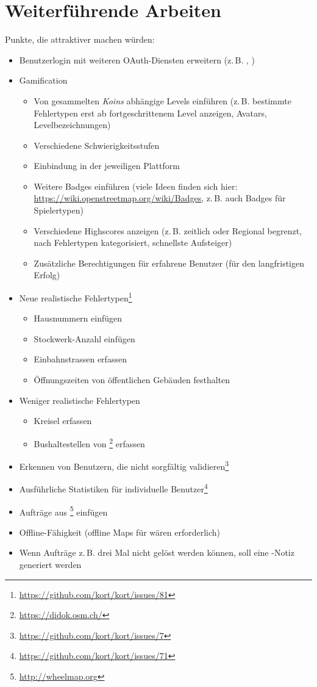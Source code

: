 \section{Weiterführende Arbeiten}
\label{pd-weiterentwicklung-realistisch}
Punkte, die \kort{} attraktiver machen würden:

\begin{itemize}
	\item Benutzerlogin mit weiteren \gls{OAuth}-Diensten erweitern (z.\,B. , )
	\item \gls{Gamification}
	\begin{itemize}
		\item Von gesammelten \emph{Koins} abhängige Levels einführen (z.\,B. bestimmte Fehlertypen erst ab fortgeschrittenem Level anzeigen, Avatars, Levelbezeichnungen)
		\item Verschiedene Schwierigkeitsstufen
		\item Einbindung in  der jeweiligen Plattform
		\item Weitere Badges einführen (viele Ideen finden sich hier: \url{https://wiki.openstreetmap.org/wiki/Badges}, z.\,B. auch Badges für Spielertypen)
		\item Verschiedene Highscores anzeigen (z.\,B. zeitlich oder Regional begrenzt, nach Fehlertypen kategorisiert, schnellste Aufsteiger)
		\item Zusätzliche Berechtigungen für erfahrene Benutzer (für den langfristigen Erfolg)
	\end{itemize}
	\item Neue realistische Fehlertypen\footnote{\url{https://github.com/kort/kort/issues/81}}
	\begin{itemize}
		\item Hausnummern einfügen
		\item Stockwerk-Anzahl einfügen
		\item Einbahnstrassen erfassen
		\item Öffnungszeiten von öffentlichen Gebäuden festhalten
	\end{itemize}
	\item Weniger realistische Fehlertypen
		\begin{itemize}
			\item Kreisel erfassen
			\item Bushaltestellen von \footnote{\url{https://didok.osm.ch/}} erfassen
		\end{itemize}
	\item Erkennen von Benutzern, die nicht sorgfältig validieren\footnote{\url{https://github.com/kort/kort/issues/7}}
	\item Ausführliche Statistiken für individuelle Benutzer\footnote{\url{https://github.com/kort/kort/issues/71}}
	\item Aufträge aus \footnote{\url{http://wheelmap.org}}	einfügen
	\item Offline-Fähigkeit (offline Maps für  wären erforderlich)
	\item Wenn Aufträge z.\,B. drei Mal nicht gelöst werden können, soll eine -Notiz generiert werden
\end{itemize}

